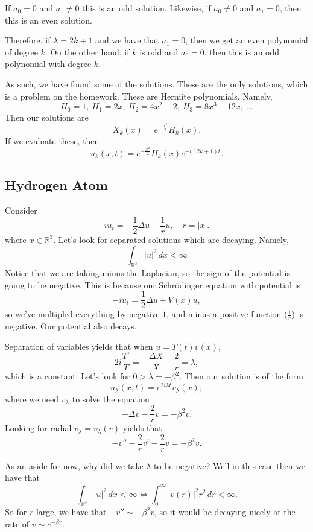\begin{remark}
If \( a_{0} = 0 \) and \( a_{1} \ne 0 \) this is an odd solution. Likewise, if \( a_{0} \ne 0 \) and \( a_{1} = 0 \), then this is an even solution. 

Therefore, if \( \lambda = 2k+1 \) and we have that \( a_{1} = 0 \), then we get an even polynomial of degree \( k \). On the other hand, if \( k \) is odd and \( a_{0} = 0 \), then this is an odd polynomial with degree \( k \).
\end{remark}
As such, we have found some of the solutions. These are the only solutions, which is a problem on the homework. These are Hermite polynomials. Namely,
\[ H_{0} = 1, \ H_{1} = 2x, \ H_{2} = 4x^{2} - 2, \ H_{3} = 8x^{3} - 12x, \ \ldots \]
Then our solutions are
\[ X_{k}(x) = e^{- \frac{x^{2}}{2}}H_{k}(x). \]
If we evaluate these, then
\[ u_{k}(x, t) = e^{- \frac{x^{2}}{2}}H_{k}(x) e^{-i(2k+1)t}. \]

\subsection{Hydrogen Atom}
Consider
\[ i u_{t} = - \frac{1}{2} \Delta u - \frac{1}{r} u, \quad r = |x|. \]
where \( x \in \mathbb{R}^{3} \). Let's look for separated solutions which are decaying. Namely,
\[ \int_{\mathbb{R}^{3}} |u|^{2} \, dx < \infty \]
Notice that we are taking minus the Laplacian, so the sign of the potential is going to be negative. This is because our Schr\"odinger equation with potential is
\[ -i u_{t} = \frac{1}{2} \Delta u + V(x) u, \]
so we've multipled everything by negative \( 1 \), and minus a positive function (\( \frac{1}{r} \)) is negative. Our potential also decays.

Separation of variables yields that when \( u = T(t) v(x) \),
\[ 2 i \frac{T'}{T} = - \frac{\Delta X}{X} - \frac{2}{r} = \lambda, \]
which is a constant. Let's look for \( 0 > \lambda = - \beta^{2} \). Then our solution is of the form
\[ u_{\lambda}(x, t) = e^{2 i \lambda t} v_{\lambda}(x), \]
where we need \( v_{\lambda} \) to solve the equation
\[ - \Delta v - \frac{2}{r} v = - \beta^{2} v. \]
Looking for radial \( v_{\lambda} = v_{\lambda}(r) \) yields that
\[ - v'' - \frac{2}{r} v' - \frac{2}{r} v = - \beta^{2} v. \]

As an aside for now, why did we take \( \lambda \) to be negative? Well in this case then we have that
\[ \int_{\mathbb{R}^{3}} |u|^{2} \, dx < \infty \iff \int_{0}^{\infty} |v(r)|^{2} r^{2}\, dr < \infty.  \]
So for \( r \) large, we have that \( - v'' \sim - \beta^{2} v \), so it would be decaying nicely at the rate of \( v \sim e^{-\beta r} \).

